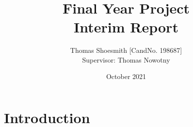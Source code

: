\documentclass{article}
\title{Final Year Project \\ Interim Report}
\author{Thomas Shoesmith [CandNo. 198687]\\{Supervisor: Thomas Nowotny}}
\date{October 2021}
\begin{document}
\maketitle

\newpage
\tableofcontents
\newpage



\section{Introduction}
\end{document}
